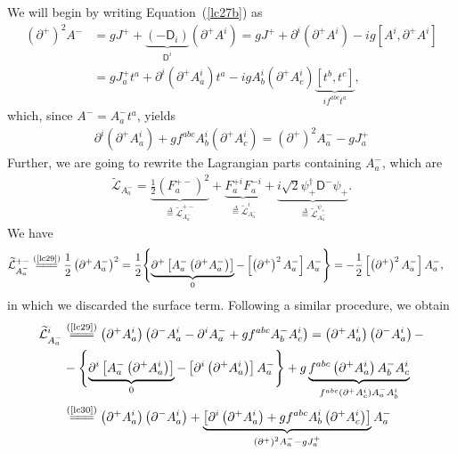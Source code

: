 \begin{note}\noindent
We will begin by writing Equation~(\cref{lc27b}) as
\begin{align*}
\left(\partial^+\right)^2A^-&=gJ^++\underbrace{(-\textsf{D}_i)}_{\textsf{D}^i}\left(\partial^+A^i\right)=gJ^++\partial^i\left(\partial^+A^i\right)-ig\left[A^i,\partial^+A^i\right]\\
&=gJ^+_at^a+\partial^i\left(\partial^+A^i_a\right)t^a-igA^i_b\left(\partial^+A^i_c\right)\underbrace{[t^b,t^c]}_{if^{abc}t^a},
\end{align*}
which, since $A^-=A_a^-t^a$, yields
\begin{align}\label{lc30}
\partial^i\left(\partial^+A^i_a\right)+gf^{abc}A^i_b\left(\partial^+A^i_c\right)=\left(\partial^+\right)^2A^-_a-gJ^+_a
\end{align}
Further, we are going to rewrite the Lagrangian parts containing $A_a^-$, which are
\begin{align*}
\widetilde{\mathcal{L}}_{A_a^-}=\underbrace{\frac{1}{2}\left(F_a^{+-}\right)^2}_{\overset{\Delta}{=}\widetilde{\mathcal{L}}_{A_a^-}^{+-}}+\underbrace{F_a^{+i}F_a^{-i}}_{\overset{\Delta}{=}\widetilde{\mathcal{L}}_{A_a^-}^i}+\underbrace{i\sqrt{2}\psi_+^\dag\textsf{D}^-\psi_+}_{\overset{\Delta}{=}\widetilde{\mathcal{L}}_{A_a^-}^{\psi_+}}.
\end{align*}
We have
\begin{align*}
\widetilde{\mathcal{L}}_{A_a^-}^{+-}&\stackrel{(\text{\cref{lc29}})}{=\joinrel=\joinrel=}\frac{1}{2}\left(\partial^+A_a^-\right)^2=\frac{1}{2}\Biggl\{\underbrace{\partial^+\left[A_a^-\left(\partial^+A_a^-\right)\right]}_{0}-\left[\left(\partial^+\right)^2A_a^-\right]A_a^-\Biggr\}=-\frac{1}{2}\left[\left(\partial^+\right)^2A_a^-\right]A_a^-,
\end{align*}
in which we discarded the surface term. Following a similar procedure, we obtain
\begin{align*}
\widetilde{\mathcal{L}}_{A_a^-}^i&\stackrel{(\text{\cref{lc29}})}{=\joinrel=\joinrel=}\left(\partial^+A_a^i\right)\left(\partial^-A_a^i-\partial^iA_a^-+gf^{abc}A_b^-A_c^i\right)=\left(\partial^+A_a^i\right)\left(\partial^-A_a^i\right)-\\
&-\Biggl\{\underbrace{\partial^i\left[A_a^-\left(\partial^+A_a^i\right)\right]}_{0}-\left[\partial^i\left(\partial^+A_a^i\right)\right]A_a^-\Biggr\}+g\underbrace{f^{abc}\left(\partial^+A_a^i\right)A_b^-A_c^i}_{f^{abc}\left(\partial^+A_c^i\right)A_a^-A_b^i}\\
&\stackrel{(\text{\cref{lc30}})}{=\joinrel=\joinrel=}\left(\partial^+A_a^i\right)\left(\partial^-A_a^i\right)+\underbrace{\left[\partial^i\left(\partial^+A^i_a\right)+gf^{abc}A^i_b\left(\partial^+A^i_c\right)\right]}_{\left(\partial^+\right)^2A^-_a-gJ^+_a}A_a^-\\

\end{align*}
\end{note}

